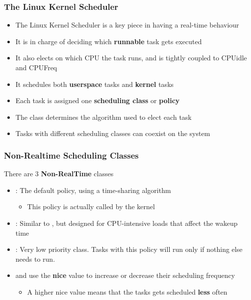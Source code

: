 \begin{frame}
	\frametitle{The Linux Kernel Scheduler}
	\begin{itemize}
		\item The Linux Kernel Scheduler is a key piece in having a real-time behaviour
		\item It is in charge of deciding which \textbf{runnable} task gets executed
		\item It also elects on which CPU the task runs, and is tightly coupled to CPUidle and CPUFreq
		\item It schedules both \textbf{userspace} tasks and \textbf{kernel} tasks
		\item Each task is assigned one \textbf{scheduling class} or \textbf{policy}
		\item The class determines the algorithm used to elect each task
		\item Tasks with different scheduling classes can coexist on the system
	\end{itemize}
\end{frame}

\begin{frame}
	\frametitle{Non-Realtime Scheduling Classes}
	There are 3 \textbf{Non-RealTime} classes
	\begin{itemize}
		\item {}: The default policy, using a time-sharing algorithm \\
		\begin{itemize}
			\item This policy is actually called  by the kernel
		\end{itemize}
		\item {}: Similar to , but designed for CPU-intensive loads that affect the wakeup time
		\item {}: Very low priority class. Tasks with this policy will run only if nothing else needs to run.
		\item {} and  use the \textbf{nice} value to increase or decrease their scheduling frequency
		\begin{itemize}
			\item A higher nice value means that the tasks gets scheduled \textbf{less} often
		\end{itemize}
	\end{itemize}
\end{frame}

